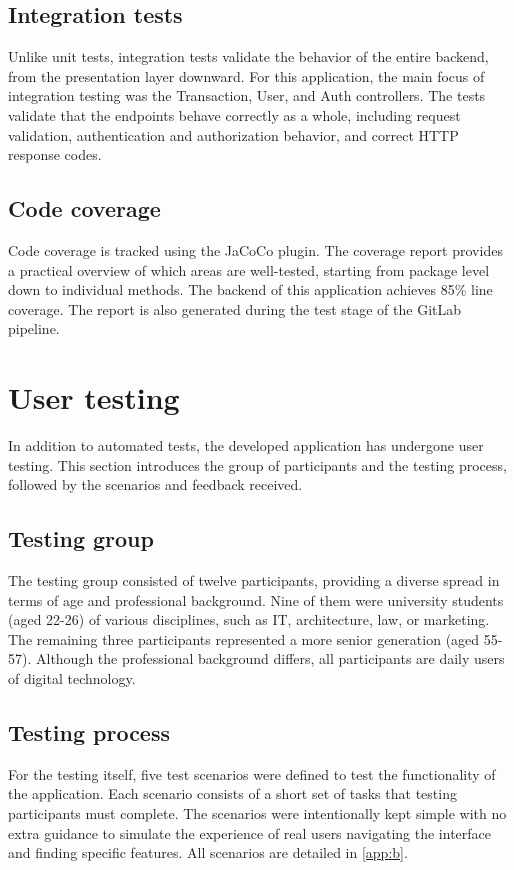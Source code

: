 \documentclass{ctuthesis}
\begin{document}
\subsection{Integration tests}
Unlike unit tests, integration tests validate the behavior of the entire backend, from the presentation layer downward. For this application, the main focus of integration testing was the Transaction, User, and Auth controllers. The tests validate that the endpoints behave correctly as a whole, including request validation, authentication and authorization behavior, and correct HTTP response codes.

\subsection{Code coverage}
Code coverage is tracked using the JaCoCo plugin. The coverage report provides a practical overview of which areas are well-tested, starting from package level down to individual methods. The backend of this application achieves 85\% line coverage. The report is also generated during the test stage of the GitLab pipeline.

\section{User testing}
In addition to automated tests, the developed application has undergone user testing. This section introduces the group of participants and the testing process, followed by the scenarios and feedback received.

\subsection{Testing group}
The testing group consisted of twelve participants, providing a diverse spread in terms of age and professional background. Nine of them were university students (aged 22-26) of various disciplines, such as IT, architecture, law, or marketing. The remaining three participants represented a more senior generation (aged 55-57). Although the professional background differs, all participants are daily users of digital technology.

\subsection{Testing process}
For the testing itself, five test scenarios were defined to test the functionality of the application. Each scenario consists of a short set of tasks that testing participants must complete. The scenarios were intentionally kept simple with no extra guidance to simulate the experience of real users navigating the interface and finding specific features. All scenarios are detailed in \autoref{app:b}.
\end{document}
